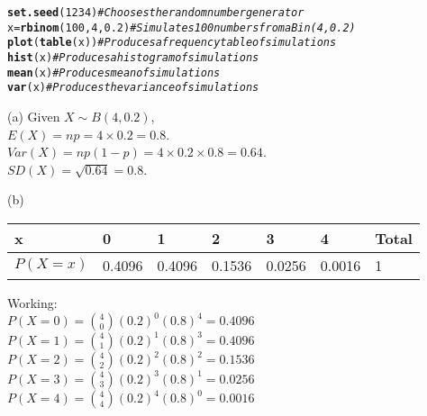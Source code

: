 \documentclass[bigtut]{tutorial}\usepackage[]{graphicx}\usepackage[]{color}
\makeatletter
\newcommand{\hlnum}[1]{\textcolor[rgb]{0.686,0.059,0.569}{#1}}%
\newcommand{\hlcom}[1]{\textcolor[rgb]{0.678,0.584,0.686}{\textit{#1}}}%
\newcommand{\hlstd}[1]{\textcolor[rgb]{0.345,0.345,0.345}{#1}}%
\newcommand{\hlkwb}[1]{\textcolor[rgb]{0.69,0.353,0.396}{#1}}%
\newcommand{\hlkwd}[1]{\textcolor[rgb]{0.737,0.353,0.396}{\textbf{#1}}}%
\newenvironment{kframe}{%
 \def\at@end@of@kframe{}%
 \ifinner\ifhmode%
  \def\at@end@of@kframe{\end{minipage}}%
  \begin{minipage}{\columnwidth}%
 \fi\fi%
 \def\FrameCommand##1{\hskip\@totalleftmargin \hskip-\fboxsep
 \colorbox{shadecolor}{##1}\hskip-\fboxsep
     \hskip-\linewidth \hskip-\@totalleftmargin \hskip\columnwidth}%
 \MakeFramed {\advance\hsize-\width
   \@totalleftmargin\z@ \linewidth\hsize
   \@setminipage}}%
 {\par\unskip\endMakeFramed%
 \at@end@of@kframe}
\newenvironment{knitrout}{}{} %
\makeatother
\begin{document}
\begin{tutorial}
\begin{questions}
\begin{parts}
\begin{knitrout}
\color{fgcolor}\begin{kframe}
\begin{alltt}
\hlkwd{set.seed}\hlstd{(}\hlnum{1234}\hlstd{)}       \hlcom{#Chooses the random number generator}
\hlstd{x}\hlkwb{=}\hlkwd{rbinom}\hlstd{(}\hlnum{100}\hlstd{,}\hlnum{4}\hlstd{,}\hlnum{0.2}\hlstd{)}  \hlcom{#Simulates 100 numbers from a Bin(4,0.2)}
\hlkwd{plot}\hlstd{(}\hlkwd{table}\hlstd{(x))}       \hlcom{#Produces a frequency table of simulations}
\hlkwd{hist}\hlstd{(x)}              \hlcom{#Produces a histogram of simulations}
\hlkwd{mean}\hlstd{(x)}              \hlcom{#Produces mean of simulations}
\hlkwd{var}\hlstd{(x)}               \hlcom{#Produces the variance of simulations}
\end{alltt}
\end{kframe}
\end{knitrout}
\end{parts}

\begin{solution}
(a) 
Given $X \sim B(4, 0.2)$, \\
$E(X) = np = 4 \times 0.2 = 0.8$. \\
$Var(X) = np(1-p) = 4 \times 0.2 \times 0.8 = 0.64$. \\
$SD(X) = \sqrt{0.64} = 0.8$.

\vspace{.5cm}
(b) \\
\begin{tabular}{| l | l | l | l | l | l | l|} \hline
x & 0  \hspace{1cm} & 1 \hspace{1cm}  & 2 \hspace{1cm} & 3 \hspace{1cm} & 4 \hspace{1cm}  &  Total \\ \hline
$P(X=x)$ & 0.4096  & 0.4096 & 0.1536 & 0.0256 & 0.0016 & 1 \\ \hline
\end{tabular}

\vspace{.5cm}
Working: \\
$P(X=0) = {4 \choose 0} (0.2)^0 (0.8)^4 = 0.4096 $ \\
$P(X=1) = {4 \choose 1} (0.2)^1 (0.8)^3 = 0.4096 $ \\
$P(X=2) = {4 \choose 2} (0.2)^2 (0.8)^2 = 0.1536 $ \\
$P(X=3) = {4 \choose 3} (0.2)^3 (0.8)^1 = 0.0256 $ \\
$P(X=4) = {4 \choose 4} (0.2)^4 (0.8)^0 = 0.0016  $\\



\end{solution}
\end{questions}
\end{tutorial}
\end{document}
